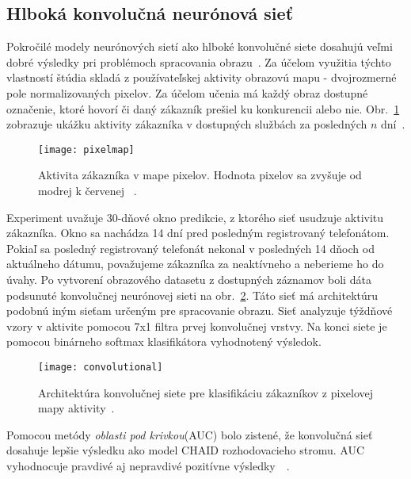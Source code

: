 \subsection{Hlboká konvolučná neurónová sieť}
\label{metoda_konvolucna}


Pokročilé modely neurónových sietí ako hlboké konvolučné siete dosahujú veľmi dobré výsledky pri problémoch spracovania obrazu~\cite{szegedy2015going}.
Za účelom využitia týchto vlastností štúdia skladá z používateľskej aktivity obrazovú mapu - dvojrozmerné pole normalizovaných pixelov. Za účelom učenia má každý obraz dostupné označenie, ktoré hovorí či daný zákazník prešiel ku konkurencii alebo nie. Obr.~\ref{fig:pixelmap} zobrazuje ukážku aktivity zákazníka v dostupných službách za posledných $n$ dní~\cite{wangperawong2016churn}.

\begin{figure}[H]
\begin{center}
\texttt{[image: pixelmap]}\end{center}
\caption[pixelmap]{Aktivita zákazníka v mape pixelov. Hodnota pixelov sa zvyšuje od modrej k červenej
~\cite{wangperawong2016churn}.}
\label{fig:pixelmap}
\end{figure}

Experiment uvažuje 30-dňové okno predikcie, z ktorého sieť usudzuje aktivitu zákazníka. Okno sa nachádza 14 dní pred posledným registrovaný telefonátom. Pokiaľ sa posledný registrovaný telefonát nekonal v posledných 14 dňoch od aktuálneho dátumu, považujeme zákazníka za neaktívneho a neberieme ho do úvahy.
\newline
Po vytvorení obrazového datasetu z dostupných záznamov boli dáta podsunuté konvolučnej neurónovej sieti na obr.~\ref{fig:convolutional}.
Táto sieť má architektúru podobnú iným sieťam určeným pre spracovanie obrazu. Sieť analyzuje týždňové vzory v aktivite pomocou 7x1 filtra prvej konvolučnej vrstvy. Na konci siete je pomocou binárneho softmax klasifikátora vyhodnotený výsledok.
\newline

\begin{figure}[H]
\begin{center}
\texttt{[image: convolutional]}
\caption[convolutional]{Architektúra konvolučnej siete pre klasifikáciu zákazníkov z pixelovej mapy aktivity~\cite{wangperawong2016churn}.}
\label{fig:convolutional}
\end{center}
\end{figure}

Pomocou metódy \textit{oblasti pod krivkou}(AUC) bolo zistené, že konvolučná sieť dosahuje lepšie výsledku ako model CHAID rozhodovacieho stromu. AUC vyhodnocuje pravdivé aj nepravdivé pozitívne výsledky~\cite{hanley1982meaning}~\cite{bradley1997use}.

